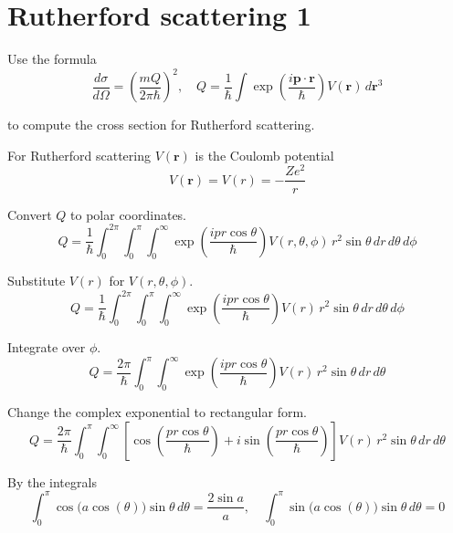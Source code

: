 

\section*{Rutherford scattering 1}

Use the formula
\begin{equation*}
\frac{d\sigma}{d\Omega}=\left(\frac{mQ}{2\pi\hbar}\right)^2,\quad
Q=\frac{1}{\hbar}\int\exp\left(\frac{i\mathbf p\cdot\mathbf r}{\hbar}\right)V(\mathbf r)\,d\mathbf r^3
\end{equation*}

to compute the cross section for Rutherford scattering.

\bigskip
For Rutherford scattering $V(\mathbf r)$ is the Coulomb potential
\begin{equation*}
V(\mathbf r)=V(r)=-\frac{Ze^2}{r}
\end{equation*}

Convert $Q$ to polar coordinates.
\begin{equation*}
Q=\frac{1}{\hbar}
\int_0^{2\pi}
\int_0^\pi
\int_0^\infty
\exp\left(\frac{ipr\cos\theta}{\hbar}\right)V(r,\theta,\phi)
\,r^2\sin\theta\,dr\,d\theta\,d\phi
\end{equation*}

Substitute $V(r)$ for $V(r,\theta,\phi)$.
\begin{equation*}
Q=\frac{1}{\hbar}
\int_0^{2\pi}
\int_0^\pi
\int_0^\infty
\exp\left(\frac{ipr\cos\theta}{\hbar}\right)V(r)
\,r^2\sin\theta\,dr\,d\theta\,d\phi
\end{equation*}

Integrate over $\phi$.
\begin{equation*}
Q=\frac{2\pi}{\hbar}
\int_0^\pi
\int_0^\infty
\exp\left(\frac{ipr\cos\theta}{\hbar}\right)V(r)
\,r^2\sin\theta\,dr\,d\theta
\end{equation*}

Change the complex exponential to rectangular form.
\begin{equation*}
Q=\frac{2\pi}{\hbar}
\int_0^\pi
\int_0^\infty
\left[
\cos\left(\frac{pr\cos\theta}{\hbar}\right)
+i\sin\left(\frac{pr\cos\theta}{\hbar}\right)
\right]
V(r)\,r^2\sin\theta\,dr\,d\theta
\end{equation*}

By the integrals
\begin{equation*}
\int_0^\pi\cos\bigl(a\cos(\theta)\bigr)\sin\theta\,d\theta=\frac{2\sin a}{a},\quad
\int_0^\pi\sin\bigl(a\cos(\theta)\bigr)\sin\theta\,d\theta=0
\end{equation*}

